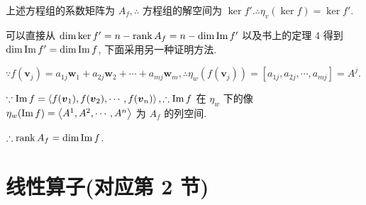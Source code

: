 \documentclass{ctexart}
\begin{document}
上述方程组的系数矩阵为 $A_f,\therefore$ 方程组的解空间为 $\ker f'.\therefore\eta_v(\ker f)=\ker f'$.

可以直接从 $\dim\ker f'=n-\operatorname{rank} A_f=n-\dim\operatorname{Im} f'$ 以及书上的定理 4 得到 $\dim\operatorname{Im} f'=\dim\operatorname{Im} f$, 下面采用另一种证明方法.

$\because f(\boldsymbol{v}_j)=a_{1j}\boldsymbol{w}_1+a_{2j}\boldsymbol{w}_2+\cdots+a_{mj}\boldsymbol{w}_m,\therefore\eta_w(f(\boldsymbol{v}_j))=[a_{1j},a_{2j},\cdots,a_{mj}]=A^{j}$.

$\because\operatorname{Im} f=\left<f(\boldsymbol{v}_1),f(\boldsymbol{v}_2),\cdots,f(\boldsymbol{v}_n)\right>,\therefore\operatorname{Im} f$ 在 $\eta_w$ 下的像 $\eta_w(\operatorname{Im} f)=\left<A^{1},A^{2},\cdots,A^{n}\right>$ 为 $A_f$ 的列空间.

$\therefore\operatorname{rank} A_f=\dim\operatorname{Im} f$.
\section{线性算子(对应第 2 节)}
\end{document}
